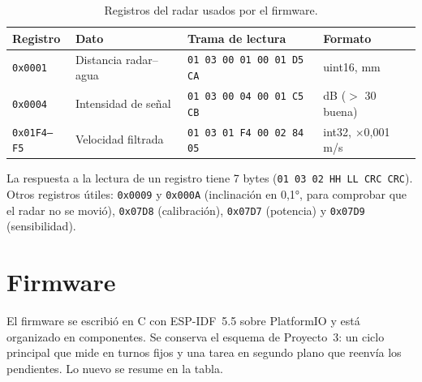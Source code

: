 \documentclass[11pt,a4paper]{article}
\newcommand{\seccion}[1]{\needspace{10\baselineskip}\section{#1}}
\begin{document}
\begin{table}[H]
    \centering
    \small
    \caption{Registros del radar usados por el firmware.}
    \begin{tabular}{llll}
        \toprule
        \textbf{Registro} & \textbf{Dato} & \textbf{Trama de lectura} & \textbf{Formato} \\
        \midrule
        \texttt{0x0001} & Distancia radar--agua & \texttt{01 03 00 01 00 01 D5 CA} & uint16, mm \\
        \texttt{0x0004} & Intensidad de señal & \texttt{01 03 00 04 00 01 C5 CB} & dB ($>$ 30 buena) \\
        \texttt{0x01F4--F5} & Velocidad filtrada & \texttt{01 03 01 F4 00 02 84 05} & int32, $\times$0,001 m/s \\
        \bottomrule
    \end{tabular}
\end{table}

La respuesta a la lectura de un registro tiene 7 bytes
(\texttt{01 03 02 HH LL CRC CRC}). Otros registros útiles: \texttt{0x0009} y
\texttt{0x000A} (inclinación en 0,1°, para comprobar que el radar no se movió),
\texttt{0x07D8} (calibración), \texttt{0x07D7} (potencia) y \texttt{0x07D9}
(sensibilidad).

\seccion{Firmware}

El firmware se escribió en C con ESP-IDF~5.5 sobre PlatformIO y está
organizado en componentes. Se conserva el esquema de Proyecto~3: un ciclo
principal que mide en turnos fijos y una tarea en segundo plano que reenvía
los pendientes. Lo nuevo se resume en la tabla.
\end{document}
